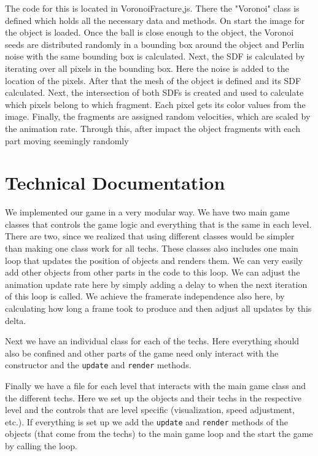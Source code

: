 \documentclass{article}
\begin{document}
The code for this is located in VoronoiFracture,js. There the "Voronoi" class is defined which holds all the necessary data and methods. On start the image for the object is loaded. Once the ball is close enough to the object, the Voronoi seeds are distributed randomly in a bounding box around the object and Perlin noise with the same bounding box is calculated. Next, the SDF is calculated by iterating over all pixels in the bounding box. Here the noise is added to the location of the pixels. After that the mesh of the object is defined and its SDF calculated. Next, the intersection of both SDFs is created and used to calculate which pixels belong to which fragment. Each pixel gets its color values from the image. Finally, the fragments are assigned random velocities, which are scaled by the animation rate. Through this, after impact the object fragments with each part moving seemingly randomly
\section{Technical Documentation}


We implemented our game in a very modular way. We have two main game classes that controls the game logic 
and everything that is the same in each level. There are two, since we realized that using different classes would be simpler than making one class work for all techs. These classes also includes one main loop that 
updates the position of objects and renders them. We can very easily add other objects from other parts in the 
code to this loop. We can adjust the animation update rate here 
by simply adding a delay to when the next iteration of this loop is called. 
We achieve the framerate independence also here, by calculating how long a frame took to produce 
and then adjust all updates by this delta. 

Next we have an individual class for each of the techs. Here everything should 
also be confined and other parts of the game need only interact with the constructor
and the \texttt{update} and \texttt{render} methods.

Finally we have a file for each level that interacts with the main game 
class and the different techs. Here we set up
the objects and their techs in the respective level and the controls that are level specific (visualization, speed adjustment, etc.).
If everything is set up we add the \texttt{update} and \texttt{render} methods of the objects (that come from the techs) 
to the main game loop and the start the game by calling the loop.
\end{document}
